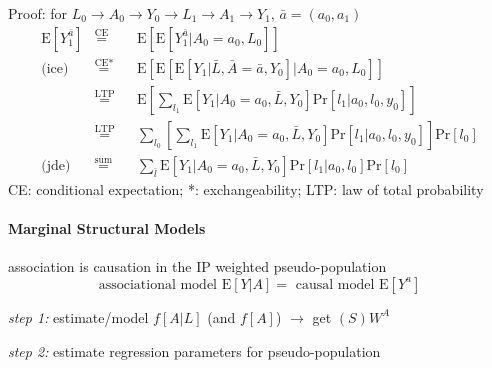 \documentclass[8pt]{extarticle}
\begin{document}
\begin{multicols}{2}
\begin{mdframed}[style=MyFrame,nobreak=true, innerleftmargin=2pt, innerrightmargin=2pt]
Proof: for $L_0 \rightarrow A_0 \rightarrow Y_0 \rightarrow L_1 \rightarrow A_1 \rightarrow Y_1$, $\bar{a} =(a_0,a_1)$ 
\begin{alignat*}{4} 
\mathrm{E}\left[Y_1^{\bar{a}}\right] & \overset{\text{CE}}{=} && \mathrm{E}\left[\mathrm{E}\left[   Y_1^{\bar{a}}|A_0{=}a_0, L_0   \right]\right]  \\ 
\text{(ice)}\,\,\, &\overset{\text{CE*}}{=} && \mathrm{E}\left[\mathrm{E}\left[  \mathrm{E}\left[Y_1|\bar{L}, \bar{A}{=}\bar{a}, Y_0 \right]| A_0{=}a_0, L_0   \right]\right]  \\ 
&\overset{\text{LTP}}{=} && \mathrm{E}\left[ \sum\nolimits_{l_1} \mathrm{E}\left[Y_1|A_0{=}a_0, \bar{L}, Y_0\right] \mathrm{Pr}\left[l_1|a_0,l_0, y_0\right]         \right] \\
&\overset{\text{LTP}}{=} && \sum\nolimits_{l_0}\!\!\!\left[ \sum\nolimits_{l_1} \!\!\!\mathrm{E}\left[Y_1|A_0{=}a_0, \bar{L}, Y_0\right] \mathrm{Pr}\left[l_1|a_0,l_0, y_0\right]         \right] \mathrm{Pr}\left[l_0\right] \\
\text{(jde)}\,\,\, &\overset{\text{sum}}{=} &&  \sum\nolimits_{\bar{l}} \mathrm{E}\left[Y_1|A_0{=}a_0, \bar{L}, Y_0\right] \mathrm{Pr}\left[l_1|a_0,l_0\right]          \mathrm{Pr}\left[l_0\right] 
\end{alignat*}
CE: conditional expectation; *: exchangeability; \newline LTP: law of total probability
\end{mdframed}


















\paragraph{\large Marginal Structural Models} association is causation in the IP weighted pseudo-population 
$$\text{associational model } \mathrm{E}\left[Y|A\right] = \text{ causal model } \mathrm{E}\left[Y^a\right]$$

\noindent \textit{step 1:} estimate/model $f\left[A|L\right]$ (and $f\left[A\right]$) $\rightarrow$ get $(S)W^A$

\noindent \textit{step 2:} estimate regression parameters for pseudo-population


\end{multicols}
\end{document}

